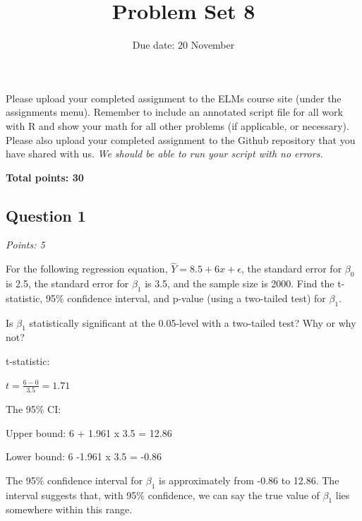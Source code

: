 \documentclass[
  letterpaper,
  DIV=11,
  numbers=noendperiod]{scrartcl}
\title{Problem Set 8}
\subtitle{Due date: 20 November}
\author{}
\date{}
\renewcommand*\contentsname{Table of contents}
\newcommand\contentsname{Table of contents}
\begin{document}
\maketitle
\ifdefined\Shaded\renewenvironment{Shaded}{\begin{tcolorbox}[boxrule=0pt, interior hidden, frame hidden, borderline west={3pt}{0pt}{shadecolor}, enhanced, sharp corners, breakable]}{\end{tcolorbox}}\fi

\renewcommand*\contentsname{Table of contents}
{
\hypersetup{linkcolor=}
\setcounter{tocdepth}{3}
\tableofcontents
}
Please upload your completed assignment to the ELMs course site (under
the assignments menu). Remember to include an annotated script file for
all work with R and show your math for all other problems (if
applicable, or necessary). Please also upload your completed assignment
to the Github repository that you have shared with us. \emph{We should
be able to run your script with no errors.}

\textbf{Total points: 30}

\hypertarget{question-1}{%
\subsection{Question 1}\label{question-1}}

\emph{Points: 5}

For the following regression equation,
\(\hat{Y} = 8.5 + 6x + \epsilon\), the standard error for \(\beta_0\) is
2.5, the standard error for \(\beta_1\) is 3.5, and the sample size is
2000. Find the t-statistic, 95\% confidence interval, and p-value (using
a two-tailed test) for \(\beta_1\).

Is \(\beta_1\) statistically significant at the 0.05-level with a
two-tailed test? Why or why not?

t-statistic:

\(t = \frac{6-0}{3.5} = 1.71\)

The 95\% CI:

Upper bound: 6 + 1.961 x 3.5 = 12.86

Lower bound: 6 -1.961 x 3.5 = -0.86

The 95\% confidence interval for \(\beta_1\)\hspace{0pt} is
approximately from -0.86 to 12.86. The interval suggests that, with 95\%
confidence, we can say the true value of
\(\beta_1\)\hspace{0pt}\hspace{0pt} lies somewhere within this range.
\end{document}
